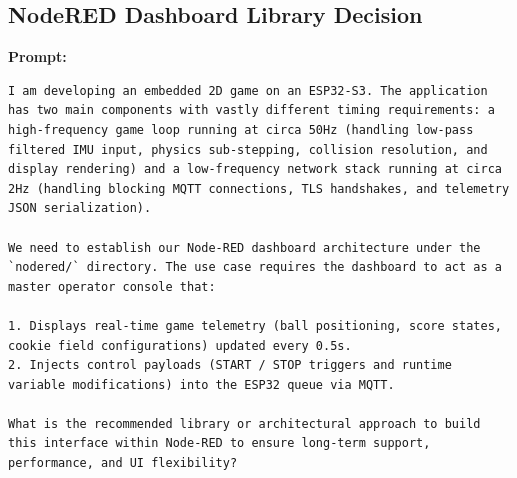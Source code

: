 \subsection*{NodeRED Dashboard Library Decision}

\textbf{Prompt:}
\begin{lstlisting}[language={}, breaklines=true]
I am developing an embedded 2D game on an ESP32-S3. The application has two main components with vastly different timing requirements: a high-frequency game loop running at circa 50Hz (handling low-pass filtered IMU input, physics sub-stepping, collision resolution, and display rendering) and a low-frequency network stack running at circa 2Hz (handling blocking MQTT connections, TLS handshakes, and telemetry JSON serialization).

We need to establish our Node-RED dashboard architecture under the `nodered/` directory. The use case requires the dashboard to act as a master operator console that:

1. Displays real-time game telemetry (ball positioning, score states, cookie field configurations) updated every 0.5s.
2. Injects control payloads (START / STOP triggers and runtime variable modifications) into the ESP32 queue via MQTT.

What is the recommended library or architectural approach to build this interface within Node-RED to ensure long-term support, performance, and UI flexibility?
\end{lstlisting}

